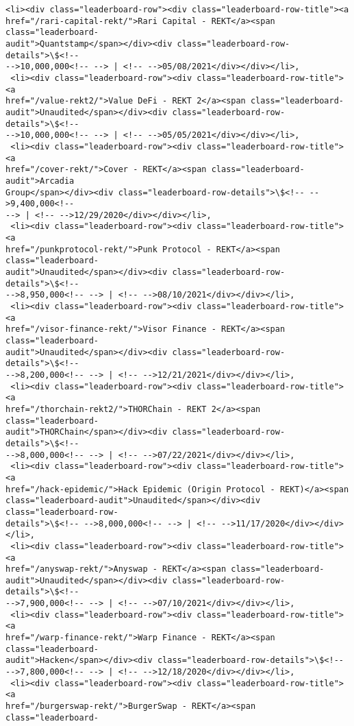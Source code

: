 \documentclass[11pt]{article}
\begin{document}
\begin{tcolorbox}[breakable, size=fbox, boxrule=.5pt, pad at break*=1mm, opacityfill=0]
\begin{Verbatim}[commandchars=\\\{\}]
 <li><div class="leaderboard-row"><div class="leaderboard-row-title"><a
href="/rari-capital-rekt/">Rari Capital - REKT</a><span class="leaderboard-
audit">Quantstamp</span></div><div class="leaderboard-row-details">\$<!--
-->10,000,000<!-- --> | <!-- -->05/08/2021</div></div></li>,
 <li><div class="leaderboard-row"><div class="leaderboard-row-title"><a
href="/value-rekt2/">Value DeFi - REKT 2</a><span class="leaderboard-
audit">Unaudited</span></div><div class="leaderboard-row-details">\$<!--
-->10,000,000<!-- --> | <!-- -->05/05/2021</div></div></li>,
 <li><div class="leaderboard-row"><div class="leaderboard-row-title"><a
href="/cover-rekt/">Cover - REKT</a><span class="leaderboard-audit">Arcadia
Group</span></div><div class="leaderboard-row-details">\$<!-- -->9,400,000<!--
--> | <!-- -->12/29/2020</div></div></li>,
 <li><div class="leaderboard-row"><div class="leaderboard-row-title"><a
href="/punkprotocol-rekt/">Punk Protocol - REKT</a><span class="leaderboard-
audit">Unaudited</span></div><div class="leaderboard-row-details">\$<!--
-->8,950,000<!-- --> | <!-- -->08/10/2021</div></div></li>,
 <li><div class="leaderboard-row"><div class="leaderboard-row-title"><a
href="/visor-finance-rekt/">Visor Finance - REKT</a><span class="leaderboard-
audit">Unaudited</span></div><div class="leaderboard-row-details">\$<!--
-->8,200,000<!-- --> | <!-- -->12/21/2021</div></div></li>,
 <li><div class="leaderboard-row"><div class="leaderboard-row-title"><a
href="/thorchain-rekt2/">THORChain - REKT 2</a><span class="leaderboard-
audit">THORChain</span></div><div class="leaderboard-row-details">\$<!--
-->8,000,000<!-- --> | <!-- -->07/22/2021</div></div></li>,
 <li><div class="leaderboard-row"><div class="leaderboard-row-title"><a
href="/hack-epidemic/">Hack Epidemic (Origin Protocol - REKT)</a><span
class="leaderboard-audit">Unaudited</span></div><div class="leaderboard-row-
details">\$<!-- -->8,000,000<!-- --> | <!-- -->11/17/2020</div></div></li>,
 <li><div class="leaderboard-row"><div class="leaderboard-row-title"><a
href="/anyswap-rekt/">Anyswap - REKT</a><span class="leaderboard-
audit">Unaudited</span></div><div class="leaderboard-row-details">\$<!--
-->7,900,000<!-- --> | <!-- -->07/10/2021</div></div></li>,
 <li><div class="leaderboard-row"><div class="leaderboard-row-title"><a
href="/warp-finance-rekt/">Warp Finance - REKT</a><span class="leaderboard-
audit">Hacken</span></div><div class="leaderboard-row-details">\$<!--
-->7,800,000<!-- --> | <!-- -->12/18/2020</div></div></li>,
 <li><div class="leaderboard-row"><div class="leaderboard-row-title"><a
href="/burgerswap-rekt/">BurgerSwap - REKT</a><span class="leaderboard-

\end{Verbatim}
\end{tcolorbox}
\end{document}
